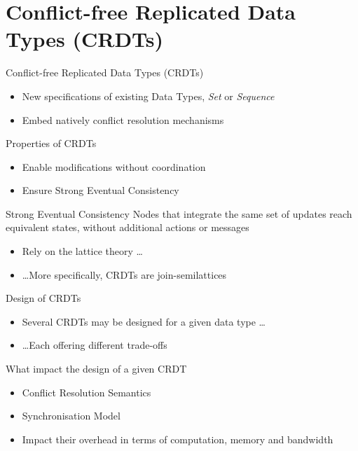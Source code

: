 \section{Conflict-free Replicated Data Types (CRDTs)}

\begin{frame}{Conflict-free Replicated Data Types (CRDTs)  \cite{shapiro_2011_crdt}}
    \begin{itemize}
        \item New specifications of existing Data Types, \eg \emph{Set} or \emph{Sequence}
        \item Embed natively conflict resolution mechanisms
    \end{itemize}
    \pause
    \begin{block}{Properties of CRDTs}
        \begin{itemize}
            \item Enable modifications \alert{without coordination}
            \item Ensure \alert{Strong Eventual Consistency}
        \end{itemize}
    \end{block}
    \pause
    \begin{block}{Strong Eventual Consistency}
        Nodes that integrate the same set of updates reach equivalent states, \alert{without additional actions or messages}
    \end{block}
    \pause
    \begin{itemize}
        \item Rely on the lattice theory \dots
        \item \dots More specifically, \alert{CRDTs are join-semilattices}
    \end{itemize}
\end{frame}

\begin{frame}{Design of CRDTs}
    \begin{itemize}
        \item \alert{Several CRDTs} may be designed \alert{for a given data type} \dots
        \item \dots Each offering different trade-offs
    \end{itemize}
    \pause
    \begin{block}{What impact the design of a given CRDT \cite{2018-crdts-overview-preguica}}
        \begin{itemize}
            \item Conflict Resolution Semantics
            \item Synchronisation Model
        \end{itemize}
    \end{block}
    \pause
    \begin{itemize}
        \item Impact their \alert{overhead in terms of computation, memory and bandwidth}
    \end{itemize}
\end{frame}